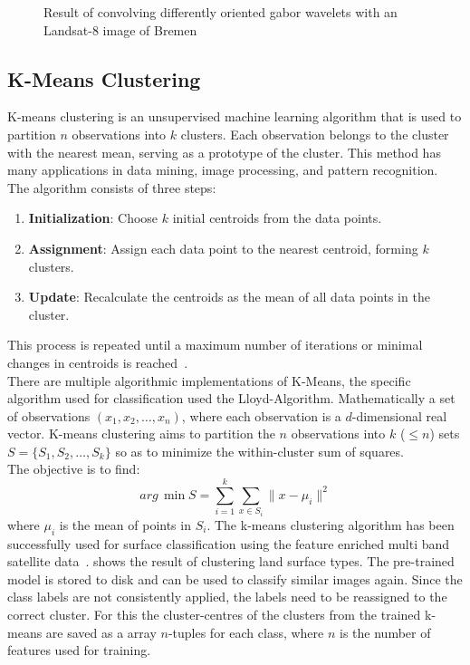 \documentclass[12pt,a4paper, english,twoside]{scrartcl}
\begin{document}
\begin{figure}[!htbp]
\begin{subfigure}[b]{0.45\textwidth}
           \label{fig:feat06}
       \end{subfigure}
          \caption{Result of convolving differently oriented gabor wavelets with an Landsat-8 image of Bremen}\label{fig:gaborExample}
      \end{figure}
      \newpage
      \subsection{K-Means Clustering}\label{sec:kmeans}
    K-means clustering is an unsupervised machine learning algorithm that is used to partition $n$ observations into $k$ clusters. 
    Each observation belongs to the cluster with the nearest mean, serving as a prototype of the cluster. 
    This method has many applications in data mining, image processing, and pattern recognition.\\
    The algorithm consists of three steps:
    \begin{enumerate}
        \item \textbf{Initialization}: Choose $k$ initial centroids from the data points.
        \item \textbf{Assignment}: Assign each data point to the nearest centroid, forming $k$ clusters.
        \item \textbf{Update}: Recalculate the centroids as the mean of all data points in the cluster. 
    \end{enumerate}
    This process is repeated until a maximum number of iterations or minimal changes in centroids is reached~\autocite{Sinaga2020}.\\ 
    There are multiple algorithmic implementations of K-Means, the specific algorithm used for classification used the Lloyd-Algorithm.
    Mathematically a set of observations $(x_1, x_2, \ldots, x_n)$, where each observation is a $d$-dimensional real vector.
    K-means clustering aims to partition the $n$ observations into $k$ ($\leq n$) sets $S = \{S_1, S_2, \ldots, S_k\}$ so as to minimize the within-cluster sum of squares. \\
    The objective is to find:
    \begin{equation}
        arg\,\min{S} = \sum_{i=1}^{k} \sum_{x \in S_i} \| x - \mu_i \|^2
    \end{equation}
    where $\mu_i$ is the mean of points in $S_i$.
    The k-means clustering algorithm has been successfully used for surface classification using the feature enriched multi band satellite data~\autocite[e.g.]{Burrough2000}.
     shows the result of clustering land surface types. 
    The pre-trained model is stored to disk and can be used to classify similar images again. 
    Since the class labels are not consistently applied, the labels need to be reassigned to the correct cluster.
    For this the cluster-centres of the clusters from the trained k-means are saved as a array $n$-tuples for each class, where $n$ is the number of features used for training.
    \newpage
\end{document}

